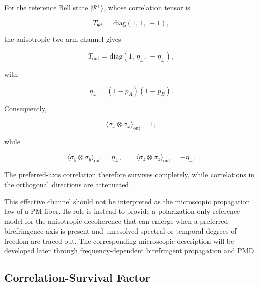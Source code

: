 For the reference Bell state \( |\Psi^+\rangle \), whose correlation tensor is

\begin{equation}
T_{\Psi^+}
=
\mathrm{diag}
\left(
1,\,
1,\,
-1
\right),
\label{eq:psi_plus_correlation_tensor_pm}
\end{equation}

the anisotropic two-arm channel gives

\begin{equation}
T_{\mathrm{out}}
=
\mathrm{diag}
\left(
1,\,
\eta_{\perp},\,
-\eta_{\perp}
\right),
\label{eq:anisotropic_pm_tensor_psiplus}
\end{equation}

with

\begin{equation}
\eta_{\perp}
=
(1-p_A)(1-p_B).
\label{eq:anisotropic_transverse_survival_factor}
\end{equation}

Consequently,

\begin{equation}
\langle
\sigma_x\otimes\sigma_x
\rangle_{\mathrm{out}}
=
1,
\end{equation}

while

\begin{equation}
\langle
\sigma_y\otimes\sigma_y
\rangle_{\mathrm{out}}
=
\eta_{\perp},
\qquad
\langle
\sigma_z\otimes\sigma_z
\rangle_{\mathrm{out}}
=
-\eta_{\perp}.
\label{eq:anisotropic_psiplus_correlations}
\end{equation}

The preferred-axis correlation therefore survives completely, while correlations
in the orthogonal directions are attenuated.

This effective channel should not be interpreted as the microscopic propagation
law of a PM fiber. Its role is instead to provide a polarization-only reference
model for the anisotropic decoherence that can emerge when a preferred
birefringence axis is present and unresolved spectral or temporal degrees of
freedom are traced out. The corresponding microscopic description will be
developed later through frequency-dependent birefringent propagation and PMD.


\subsection{Correlation-Survival Factor}
\label{subsec:correlation_survival_factor}

